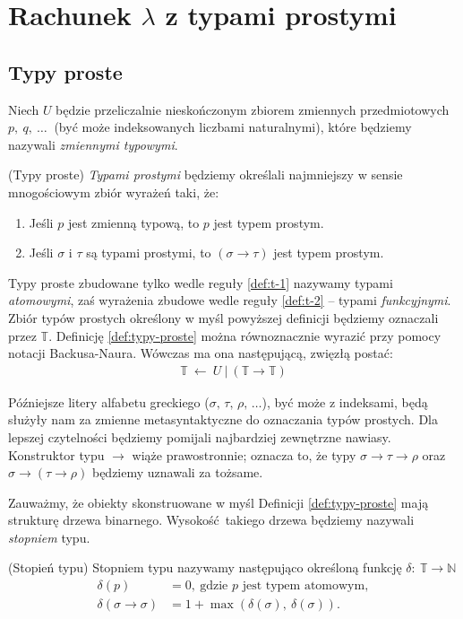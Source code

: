 \section{Rachunek \(\lambda\) z typami prostymi}\label{sec:simple_types}
\subsection{Typy proste}\label{ssec:typy-proste}
Niech \(U\) będzie przeliczalnie nieskończonym zbiorem zmiennych przedmiotowych \(p,\ q,\ \dots\ \) (być może indeksowanych liczbami naturalnymi), które będziemy nazywali \emph{zmiennymi typowymi}.

\begin{definicja}\label{def:typy-proste}(Typy proste)
\emph{Typami prostymi} będziemy określali najmniejszy w sensie mnogościowym zbiór wyrażeń taki, że:
\begin{enumerate}[label=(S\arabic*)]
  \setlength\itemsep{0em}
  \item Jeśli \(p\) jest zmienną typową, to \(p\) jest typem prostym.\label{def:t-1}
  \item Jeśli \(\sigma\) i \(\tau\) są typami prostymi, to \(\left(\sigma\to\tau\right)\) jest typem prostym.\label{def:t-2}
\end{enumerate}
\end{definicja}

Typy proste zbudowane tylko wedle reguły \ref{def:t-1} nazywamy typami \emph{atomowymi}, zaś wyrażenia zbudowe wedle reguły \ref{def:t-2} -- typami \emph{funkcyjnymi}. Zbiór typów prostych określony w myśl powyższej definicji będziemy oznaczali przez \(\mathbb{T}\). Definicję \ref{def:typy-proste} można równoznacznie wyrazić przy pomocy notacji Backusa-Naura. Wówczas ma ona następującą, zwięzłą postać:
\begin{align*}
  \mathbb{T}\ \leftarrow \ U\ |\ (\mathbb{T}\to\mathbb{T})
\end{align*}

Późniejsze litery alfabetu greckiego (\(\sigma,\, \tau,\, \rho,\,\dots\)), być może z indeksami, będą służyły nam za zmienne metasyntaktyczne do oznaczania typów prostych. Dla lepszej czytelności będziemy pomijali najbardziej zewnętrzne nawiasy. Konstruktor typu \(\to\) wiąże prawostronnie; oznacza to, że typy \(\sigma\to\tau\to\rho\) oraz \(\sigma\to(\tau\to\rho)\) będziemy uznawali za tożsame.

Zauważmy, że obiekty skonstruowane w myśl Definicji \ref{def:typy-proste} mają strukturę drzewa binarnego. Wysokość takiego drzewa będziemy nazywali \emph{stopniem} typu. 
\begin{definicja}\label{def:stopien-typu}(Stopień typu)
  Stopniem typu nazywamy następująco określoną funkcję \(\delta :\: \mathbb{T} \to \mathbb{N}\)
  \begin{align*}
    \delta(p) &= 0,\ \text{gdzie \(p\) jest typem atomowym},\\
    \delta(\sigma\to\sigma)&=1 + \max\left(\delta(\sigma),\ \delta(\sigma)\right).
  \end{align*}
\end{definicja}

